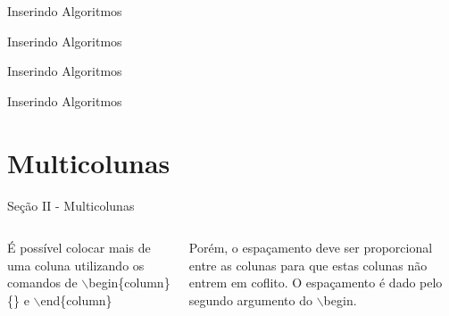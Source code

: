 \documentclass{libs/ufc_format}
\begin{document}

\begin{frame}{Inserindo Algoritmos}
    \lstset{language=Python}
    
\end{frame}

\begin{frame}{Inserindo Algoritmos}
    
\end{frame}

\begin{frame}{Inserindo Algoritmos}
    
\end{frame}

\begin{frame}{Inserindo Algoritmos}
    
\end{frame}

\section{Multicolunas}
\begin{frame}{Seção II - Multicolunas}
    \begin{columns}{}
        \begin{column}{0.5\textwidth}
            \justify
            É possível colocar mais de uma coluna utilizando os comandos de $\backslash$begin\{column\}\{\} e $\backslash$end\{column\}
        \end{column}
        \begin{column}{0.5\textwidth}
            \justify
            Porém, o espaçamento deve ser proporcional entre as colunas para que estas colunas não entrem em coflito. O espaçamento é dado pelo segundo argumento do $\backslash$begin.
        \end{column}
    \end{columns}    
\end{frame}

\end{document}
